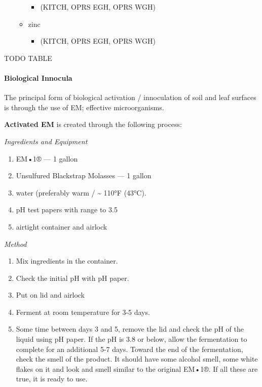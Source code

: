 \begin{itemize}
\begin{itemize}
    \begin{itemize}
    \itemsep1pt\parskip0pt
    \item
      (KITCH, OPRS EGH, OPRS WGH)
    \end{itemize}
  \item
    zinc

    \begin{itemize}
    \itemsep1pt\parskip0pt
    \item
      (KITCH, OPRS EGH, OPRS WGH)
    \end{itemize}
  \end{itemize}
\end{itemize}

TODO TABLE

\paragraph{Biological Innocula}\label{biological-innocula}

The principal form of biological activation / innoculation of soil and
leaf surfaces is through the use of EM; effective microorganisms.

\textbf{Activated EM} is created through the following process:

\emph{Ingredients and Equipment}

\begin{enumerate}
\def\labelenumi{\arabic{enumi}.}
\itemsep1pt\parskip0pt
\item
  EM•1® --- 1 gallon
\item
  Unsulfured Blackstrap Molasses --- 1 gallon
\item
  water (preferably warm / \textasciitilde{} 110°F (43°C).
\item
  pH test papers with range to 3.5
\item
  airtight container and airlock
\end{enumerate}

\emph{Method}

\begin{enumerate}
\def\labelenumi{\arabic{enumi}.}
\itemsep1pt\parskip0pt
\item
  Mix ingredients in the container.
\item
  Check the initial pH with pH paper.
\item
  Put on lid and airlock
\item
  Ferment at room temperature for 3-5 days.
\item
  Some time between days 3 and 5, remove the lid and check the pH of the
  liquid using pH paper. If the pH is 3.8 or below, allow the
  fermentation to complete for an additional 5-7 days. Toward the end of
  the fermentation, check the smell of the product. It should have some
  alcohol smell, some white flakes on it and look and smell similar to
  the original EM•1®. If all these are true, it is ready to use.
\end{enumerate}

